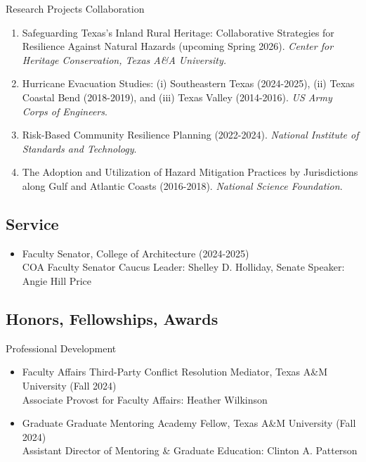 \documentclass[11pt,oneside]{article}
\begin{document}
\vspace{3pt}

{Research Projects Collaboration}
\begin{enumerate}[leftmargin=20pt]
\item Safeguarding Texas's Inland Rural Heritage: Collaborative Strategies for Resilience Against Natural Hazards (upcoming Spring 2026). \emph{Center for Heritage Conservation, Texas A\&A University.}
\item Hurricane Evacuation Studies: (i) Southeastern Texas (2024-2025), (ii) Texas Coastal Bend (2018-2019), and (iii) Texas Valley (2014-2016). \emph{US Army Corps of Engineers}.
\item Risk-Based Community Resilience Planning (2022-2024). \emph{National Institute of Standards and Technology}.
\item The Adoption and Utilization of Hazard Mitigation Practices by Jurisdictions along Gulf and Atlantic Coasts (2016-2018). \emph{National Science Foundation}.
\end{enumerate}

\subsection*{Service}
\begin{itemize}[leftmargin=20pt]
\item Faculty Senator, College of Architecture (2024-2025)\\
      COA Faculty Senator Caucus Leader: Shelley D. Holliday, Senate Speaker: Angie Hill Price
\end{itemize}

\subsection*{Honors, Fellowships, Awards}

{Professional Development}
\begin{itemize}[leftmargin=20pt]
\item Faculty Affairs Third-Party Conflict Resolution Mediator, Texas A\&M University (Fall 2024)\\
      Associate Provost for Faculty Affairs: Heather Wilkinson
\item Graduate Graduate Mentoring Academy Fellow, Texas A\&M University (Fall 2024)\\
      Assistant Director of Mentoring \& Graduate Education: Clinton A. Patterson
\end{itemize}
\end{document}
